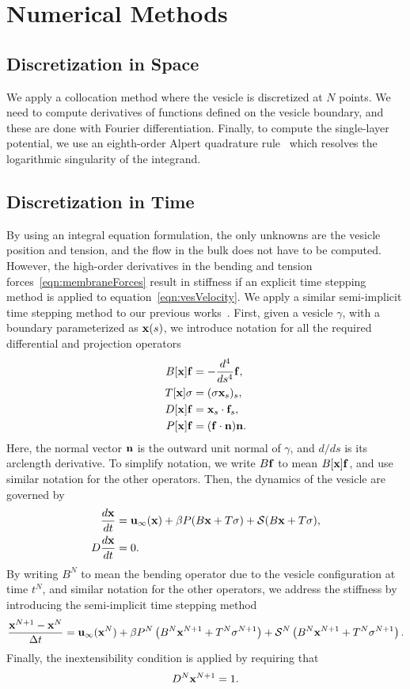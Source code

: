 \documentclass[aps,prl,showpacs]{revtex4}
\begin{document}
\section{Numerical Methods}
\subsection{Discretization in Space}
We apply a collocation method where the vesicle is discretized at $N$
points. We need to compute derivatives of functions defined on the
vesicle boundary, and these are done with Fourier differentiation.
Finally, to compute the single-layer potential, we use an eighth-order
Alpert quadrature rule~\cite{alp1999} which resolves the logarithmic
singularity of the integrand.

\subsection{Discretization in Time}
By using an integral equation formulation, the only unknowns are the
vesicle position and tension, and the flow in the bulk does not have to
be computed. However, the high-order derivatives in the bending and
tension forces~\eqref{eqn:membraneForces} result in stiffness if an
explicit time stepping method is applied to
equation~\eqref{eqn:vesVelocity}. We apply a similar semi-implicit time
stepping method to our previous works~\cite{vee-gue-zor-bir2009,
qua-bir2014}. First, given a vesicle $\gamma$, with a boundary
parameterized as $\mathbf{x}(s)$, we introduce notation for all the required
differential and projection operators
\begin{align}
  B[\mathbf{x}]\mathbf{f} &= -\frac{d^4}{ds^4} \mathbf{f}, \\
  T[\mathbf{x}]\sigma &= (\sigma \mathbf{x}_s)_s, \\
  D[\mathbf{x}]\mathbf{f} &= \mathbf{x}_s \cdot \mathbf{f}_s, \\
  P[\mathbf{x}]\mathbf{f} &= (\mathbf{f} \cdot \mathbf{n}) \mathbf{n}. 
\end{align}
Here, the normal vector $\mathbf{n}$ is the outward unit normal of $\gamma$,
and $d/ds$ is its arclength derivative. To simplify notation, we write
$B\mathbf{f}$ to mean $B[\mathbf{x}]\mathbf{f}$, and use similar notation for the other
operators. Then, the dynamics of the vesicle are governed by
\begin{align}
  \frac{d\mathbf{x}}{dt} &= \mathbf{u}_{\infty}(\mathbf{x}) + 
  \beta P(B\mathbf{x} + T\sigma) + \mathcal{S}(B\mathbf{x} + T\sigma), \\
  D \frac{d\mathbf{x}}{dt} &= 0.
\end{align}
By writing $B^N$ to mean the bending operator due to the vesicle
configuration at time $t^N$, and similar notation for the other
operators, we address the stiffness by introducing the semi-implicit
time stepping method
\begin{align}  
  \frac{\mathbf{x}^{N+1} - \mathbf{x}^N}{\Delta t} = \mathbf{u}_\infty(\mathbf{x}^N) 
  + \beta P^N\left(B^N\mathbf{x}^{N+1} + T^N\sigma^{N+1}\right) 
  + \mathcal{S}^N\left(B^N\mathbf{x}^{N+1} + T^N\sigma^{N+1}\right).
\end{align}
Finally, the inextensibility condition is applied by requiring that 
\begin{align}
  D^N\mathbf{x}^{N+1} = 1.
\end{align}
\end{document}
